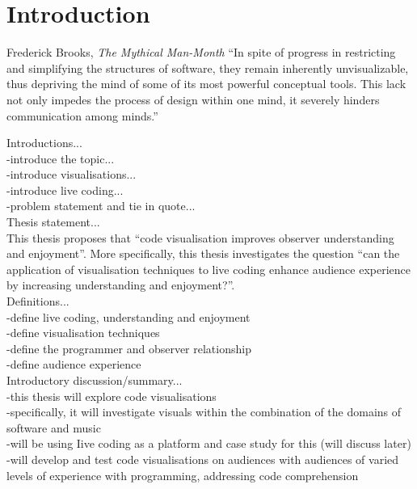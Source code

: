 
\chapter{Introduction}
\label{chap:introduction}

\begin{chapquote}{Frederick Brooks, \textit{The Mythical Man-Month}}
``In spite of progress in restricting and simplifying the structures of software, they remain inherently unvisualizable, thus depriving the mind of some of its most powerful conceptual tools. This lack not only impedes the process of design within one mind, it severely hinders communication among minds.''
\end{chapquote}

Introductions...\\
-introduce the topic...\\
-introduce visualisations...\\
-introduce live coding...\\
-problem statement and tie in quote...\\

Thesis statement...\\
This thesis proposes that ``code visualisation improves observer understanding and enjoyment''. More specifically, this thesis investigates the question ``can the application of visualisation techniques to live coding enhance audience experience by increasing understanding and enjoyment?''.\\

Definitions...\\
-define live coding, understanding and enjoyment\\
-define visualisation techniques\\
-define the programmer and observer relationship\\
-define audience experience\\

Introductory discussion/summary...\\
-this thesis will explore code visualisations\\
-specifically, it will investigate visuals within the combination of the domains of software and music\\
-will be using Iive coding as a platform and case study for this (will discuss later)\\
-will develop and test code visualisations on audiences with audiences of varied levels of experience with programming, addressing code comprehension\\


